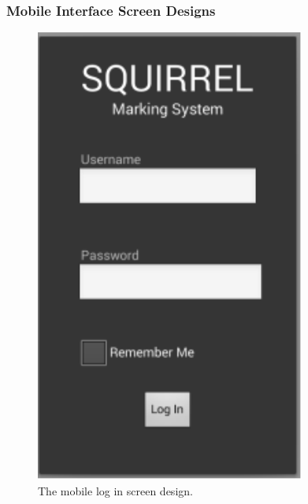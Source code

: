 \documentclass[11pt,a4paper]{article}
\begin{document}
\pagebreak

\subsubsection{Mobile Interface Screen Designs}
		\begin{figure}[h]
		\centering
		\includegraphics[width=0.7\linewidth,height=15cm]{./mobile_login}
		\caption{The mobile log in screen design.}
		\label{fig:mobile_login}
		\end{figure}

\pagebreak
\end{document}
